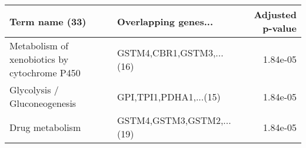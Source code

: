 \begin{tabular}{llr}
\toprule
                              Term name (33) &      Overlapping genes... &  Adjusted p-value \\
\midrule
Metabolism of xenobiotics by cytochrome P450 &  GSTM4,CBR1,GSTM3,...(16) &          1.84e-05 \\
                Glycolysis / Gluconeogenesis &    GPI,TPI1,PDHA1,...(15) &          1.84e-05 \\
                             Drug metabolism & GSTM4,GSTM3,GSTM2,...(19) &          1.84e-05 \\
\bottomrule
\end{tabular}
